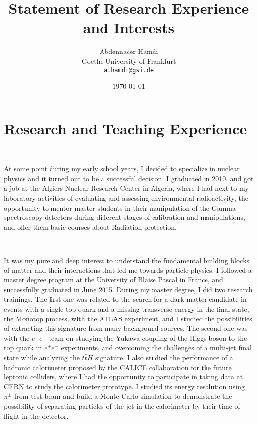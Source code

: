 \documentclass[a4paper,roman]{article}
\title{Statement of Research Experience and Interests}
\author{Abdennacer Hamdi\\
Goethe University of Frankfurt\\
\texttt{a.hamdi@gsi.de}}
\date{\today}
\begin{document}
\fontsize{12}{15}
\selectfont
\maketitle

\section*{Research and Teaching Experience}
~\par At some point during my early school years, I decided to specialize in nuclear physics and it turned out to be a successful decision. I graduated in 2010, and got a job at the Algiers Nuclear Research Center in Algeria, where I had next to my laboratory activities of evaluating and assessing environmental radioactivity, the opportunity to mentor master students in their manipulation of the Gamma spectroscopy detectors during different stages of calibration and manipulations, and offer them basic courses about Radiation protection.

~\par It was my pure and deep interest to understand the fundamental building blocks of matter and their interactions that led me towards particle physics. I followed a master degree program at the University of Blaise Pascal in France, and successfully graduated in June 2015. During my master degree, I did two research trainings. The first one was related to the search for a dark matter candidate in events with a single top quark and a missing transverse energy in the final state, the Monotop process, with the ATLAS experiment, and I studied the possibilities of extracting this signature from many background sources. The second one was with the $e^+e^-$ team on studying the Yukawa coupling of the Higgs boson to the top quark in $e^+e^-$ experiments, and overcoming the challenges of a multi-jet final state while analyzing the $t\bar{t}H$ signature. I also studied the performance of a hadronic calorimeter proposed by the CALICE collaboration for the future leptonic colliders, where I had the opportunity to participate in taking data at CERN to study the calorimeter prototype. I studied its energy resolution using $\pi^{\pm}$ from test beam and build a Monte Carlo simulation to demonstrate the possibility of separating particles of the jet in the calorimeter by their time of flight in the detector.
\end{document}
